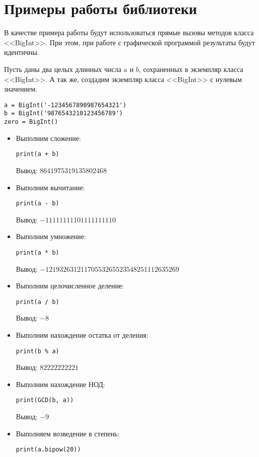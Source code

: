 \clearpage
\section{Примеры работы библиотеки}
В качестве примера работы будут использоваться прямые вызовы методов класса <<BigInt>>.
При этом, при работе с графической программой результаты будут идентичны.

Пусть даны два целых длинных числа $a$ и $b$, сохраненных в экземпляр класса <<BigInt>>.
А так же, создадим экземпляр класса <<BigInt>> с нулевым значением.
    \begin{lstlisting}
a = BigInt('-1234567890987654321')
b = BigInt('9876543210123456789')
zero = BigInt()
    \end{lstlisting}

    \begin{itemize}
        \item Выполним сложение:
        \begin{lstlisting}
print(a + b)
        \end{lstlisting}
        Вывод: $8641975319135802468$
        \item Выполним вычитание:
        \begin{lstlisting}
print(a - b)
        \end{lstlisting}
        Вывод: $-11111111101111111110$
        \item Выполним умножение:
        \begin{lstlisting}
print(a * b)
        \end{lstlisting}
        Вывод: $-12193263121170553265523548251112635269$
        \item Выполним целочисленное деление:
        \begin{lstlisting}
print(a / b)
        \end{lstlisting}
        Вывод: $-8$
        \item Выполним нахождение остатка от деления:
        \begin{lstlisting}
print(b % a)
        \end{lstlisting}
        Вывод: $82222222221$
        \item Выполним нахождение НОД:
        \begin{lstlisting}
print(GCD(b, a))
        \end{lstlisting}
        Вывод: $-9$
        \item Выполняем возведение в степень:
        \begin{lstlisting}
print(a.bipow(20))

\end{lstlisting}
\end{itemize}
